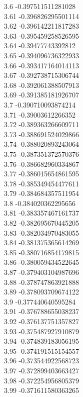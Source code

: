 {3.6	-0.397511511281028\\
3.61	-0.396826295501114\\
3.62	-0.396142211817283\\
3.63	-0.395459258526595\\
3.64	-0.39477743392812\\
3.65	-0.394096736322933\\
3.66	-0.393417164014113\\
3.67	-0.392738715306744\\
3.68	-0.392061388507913\\
3.69	-0.391385181926707\\
3.7	-0.390710093874214\\
3.71	-0.39003612266352\\
3.72	-0.389363266609711\\
3.73	-0.388691524029866\\
3.74	-0.388020893243064\\
3.75	-0.387351372570376\\
3.76	-0.386682960334867\\
3.77	-0.386015654861595\\
3.78	-0.385349454477611\\
3.79	-0.384684357511954\\
3.8	-0.384020362295656\\
3.81	-0.383357467161737\\
3.82	-0.382695670445205\\
3.83	-0.382034970483055\\
3.84	-0.381375365614269\\
3.85	-0.380716854179815\\
3.86	-0.380059434522645\\
3.87	-0.379403104987696\\
3.88	-0.378747863921888\\
3.89	-0.378093709674122\\
3.9	-0.377440640595284\\
3.91	-0.376788655038237\\
3.92	-0.376137751357827\\
3.93	-0.375487927910879\\
3.94	-0.374839183056195\\
3.95	-0.374191515154557\\
3.96	-0.373544922568723\\
3.97	-0.372899403663427\\
3.98	-0.372254956805379\\
3.99	-0.371611580363265\\
}

